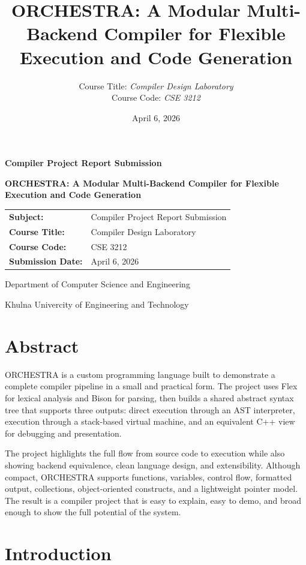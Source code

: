 \documentclass[12pt,a4paper]{article}
\title{ORCHESTRA: A Modular Multi-Backend Compiler for Flexible Execution and Code Generation}
\author{
  Course Title: \textit{Compiler Design Laboratory} \\
  Course Code: \textit{CSE 3212}
}
\date{April 6, 2026}
\renewenvironment{abstract}{%
  \section*{Abstract}
  \normalsize
}{%
  \par
}
\begin{document}
\begin{titlepage}
\centering
\vspace*{1.8cm}

{\Large \textbf{Compiler Project Report Submission} \par}
\vspace{1.6cm}

{\LARGE \textbf{ORCHESTRA: A Modular Multi-Backend Compiler for Flexible Execution and Code Generation} \par}
\vspace{2.2cm}

{\large
\begin{tabular}{>{\bfseries}l l}
Subject: & Compiler Project Report Submission \\
Course Title: & Compiler Design Laboratory \\
Course Code: & CSE 3212 \\
Submission Date: & April 6, 2026 \\
\end{tabular}
\par}

\vfill
{\large Department of Computer Science and Engineering \par}
\vspace{0.3cm}
{\large Khulna Univercity of Engineering and Technology \par}
\end{titlepage}

\begin{abstract}
ORCHESTRA is a custom programming language built to demonstrate a complete compiler pipeline in a small and practical form. The project uses Flex for lexical analysis and Bison for parsing, then builds a shared abstract syntax tree that supports three outputs: direct execution through an AST interpreter, execution through a stack-based virtual machine, and an equivalent C++ view for debugging and presentation.

The project highlights the full flow from source code to execution while also showing backend equivalence, clean language design, and extensibility. Although compact, ORCHESTRA supports functions, variables, control flow, formatted output, collections, object-oriented constructs, and a lightweight pointer model. The result is a compiler project that is easy to explain, easy to demo, and broad enough to show the full potential of the system.
\end{abstract}

\section{Introduction}
\end{document}
